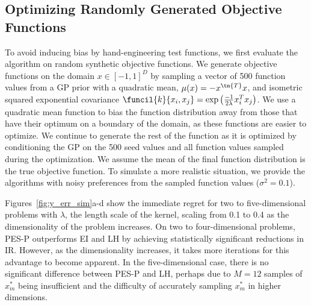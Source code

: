 \subsection{Optimizing Randomly Generated Objective Functions}

To avoid inducing bias by hand-engineering test functions, we first evaluate the
algorithm on random synthetic objective functions. We generate objective
functions on the domain $x \in {[-1, 1]}^D$ by sampling a vector of 500 function
values from a GP prior with a quadratic mean, $\mu(x) = - x^\tn{T} x$, and
isometric squared exponential covariance $\funcil{k}{x_i,x_j} = \exp
\left(\frac{-1}{2 \lambda} x_i^T x_j \right)$. We use a quadratic mean function
to bias the function distribution away from those that have their optimum on a
boundary of the domain, as these functions are easier to optimize. We continue
to generate the rest of the function as it is optimized by conditioning the GP
on the 500 seed values and all function values sampled during the optimization.
We assume the mean of the final function distribution is the true objective
function. To simulate a more realistic situation, we provide the algorithms with
noisy preferences from the sampled function values ($\sigma^2 = 0.1$).

Figures~\ref{fig:y_err_sim}a-d show the immediate regret for two to
five-dimensional problems with $\lambda$, the length scale of the kernel,
scaling from 0.1 to 0.4 as the dimensionality of the problem increases. On two
to four-dimensional problems, PES-P outperforms EI and LH by achieving
statistically significant reductions in IR\@. However, as the dimensionality
increases, it takes more iterations for this advantage to become apparent. In
the five-dimensional case, there is no significant difference between PES-P and
LH, perhaps due to $M=12$ samples of $x_m^*$ being insufficient and the
difficulty of accurately sampling $x_m^*$ in higher dimensions.

